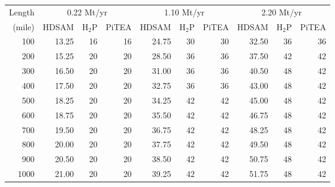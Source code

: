 \begin{tabular}{@{}r*{3}{rrr}@{}}
\toprule
Length & \multicolumn{3}{c}{0.22 Mt/yr} & \multicolumn{3}{c}{1.10 Mt/yr} & \multicolumn{3}{c}{2.20 Mt/yr} \\
\cmidrule(lr){2-4}\cmidrule(lr){5-7}\cmidrule(l){8-10}
(mile) & HDSAM & H$_2$P & PiTEA & HDSAM & H$_2$P & PiTEA & HDSAM & H$_2$P & PiTEA \\
\midrule
100 & 13.25 & 16 & 16 & 24.75 & 30 & 30 & 32.50 & 36 & 36 \\
200 & 15.25 & 20 & 20 & 28.50 & 36 & 36 & 37.50 & 42 & 42 \\
300 & 16.50 & 20 & 20 & 31.00 & 36 & 36 & 40.50 & 48 & 42 \\
400 & 17.50 & 20 & 20 & 32.75 & 36 & 36 & 43.00 & 48 & 42 \\
500 & 18.25 & 20 & 20 & 34.25 & 42 & 42 & 45.00 & 48 & 42 \\
600 & 18.75 & 20 & 20 & 35.50 & 42 & 42 & 46.75 & 48 & 42 \\
700 & 19.50 & 20 & 20 & 36.75 & 42 & 42 & 48.25 & 48 & 42 \\
800 & 20.00 & 20 & 20 & 37.75 & 42 & 42 & 49.50 & 48 & 42 \\
900 & 20.50 & 20 & 20 & 38.50 & 42 & 42 & 50.75 & 48 & 42 \\
1000 & 21.00 & 20 & 20 & 39.25 & 42 & 42 & 51.75 & 48 & 42 \\
\bottomrule
\end{tabular}
